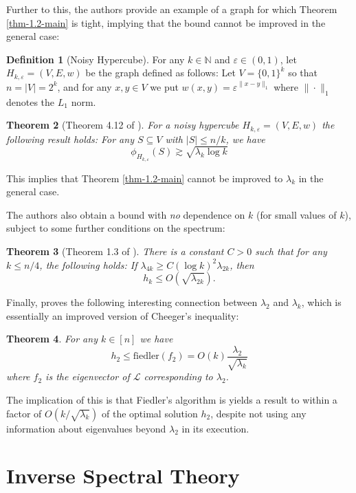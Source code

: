 \documentclass[a4paper,11pt]{article}
\newtheorem{theorem}{Theorem}[section]
\theoremstyle{definition}
\newtheorem{definition}[theorem]{Definition}
\newcommand{\N}{\mathbb{N}}
\renewcommand{\L}{\mathcal{L}}
\begin{document}
Further to this, the authors provide an example of a graph for which Theorem \ref{thm-1.2-main} is tight, implying that the bound cannot be improved in the general case:

\begin{definition}[Noisy Hypercube]
For any $k \in \N$ and $\varepsilon \in (0, 1)$, let $H_{k, \varepsilon} = (V, E, w)$ be the graph defined as follows: Let $V = \{0, 1\}^k$ so that $n = |V| = 2^k$, and for any $x, y \in V$ we put $w(x, y) = \varepsilon^{\|x - y\|_1}$ where $\|\cdot\|_1$ denotes the $L_1$ norm.
\end{definition}

\begin{theorem}[Theorem 4.12 of \cite{main}]
For a noisy hypercube $H_{k, \varepsilon} = (V, E, w)$ the following result holds: For any $S \subseteq V$ with $|S| \le n/k$, we have
\[
\phi_{H_{k, \varepsilon}}(S) \gtrsim \sqrt{\lambda_k \log k}
\]
\end{theorem}

This implies that Theorem \ref{thm-1.2-main} cannot be improved to $\lambda_k$ in the general case.

\medskip

The authors also obtain a bound with \emph{no} dependence on $k$ (for small values of $k$), subject to some further conditions on the spectrum:

\begin{theorem}[Theorem 1.3 of \cite{main}]
There is a constant $C > 0$ such that for any $k \le n/4$, the following holds: If $\lambda_{4k} \ge C(\log k)^2 \lambda_{2k}$, then \[
h_k \le O(\sqrt{\lambda_{2k}}).
\]
\end{theorem}

Finally, \cite{improved-cheeger} proves the following interesting connection between $\lambda_2$ and $\lambda_k$, which is essentially an improved version of Cheeger's inequality:

\begin{theorem} For any $k \in [n]$ we have
\[
h_2 \le \mathrm{fiedler}(f_2) = O(k)\frac{\lambda_2}{\sqrt{\lambda_k}}
\] where $f_2$ is the eigenvector of $\L$ corresponding to $\lambda_2$.
\end{theorem}

The implication of this is that Fiedler's algorithm is yields a result to within a factor of $O(k/\sqrt{\lambda_k})$ of the optimal solution $h_2$, despite not using any information about eigenvalues beyond $\lambda_2$ in its execution.

\section{Inverse Spectral Theory}\label{inverse-spectral-section}
\end{document}
